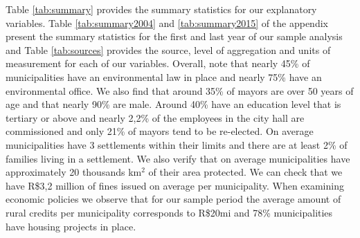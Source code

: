 Table \ref{tab:summary} provides the summary statistics for our explanatory variables. Table \ref{tab:summary2004} and \ref{tab:summary2015} of the appendix present the summary statistics for the first and last year of our sample analysis and Table \ref{tab:sources} provides the source, level of aggregation and units of measurement for each of our variables.   Overall, note that nearly 45\% of municipalities have an environmental law in place and nearly 75\% have an environmental office. We also find that around 35\% of mayors are over 50 years of age and that nearly 90\% are male. Around 40\% have an education level that is tertiary or above and nearly 2,2\% of the employees in the city hall are commissioned and only 21\% of mayors tend to be re-elected. On average municipalities have 3 settlements within their limits and there are at least 2\% of families living in a settlement. We also verify that on average municipalities have approximately 20 thousands km$^{2}$ of their area protected. We can check that we have R\$3,2 million of fines issued on average per municipality. When examining economic policies we observe that for our sample period the average amount of rural credits per municipality corresponds to R\$20mi and 78\% municipalities have housing projects in place.  


